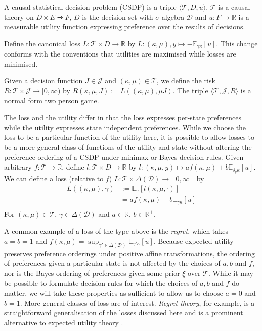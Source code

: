 \begin{definition}\label{def:CSDP}
A causal statistical decision problem (CSDP) is a triple $\langle \mathscr{T}, D, u \rangle$. $\mathscr{T}$ is a causal theory on $D\times E\rightarrowtriangle F$, $D$ is the decision set with $\sigma$-algebra $\mathcal{D}$ and $u:F\to \mathbb{R}$ is a measurable utility function expressing preference over the results of decisions.

Define the canonical loss $L:\mathscr{T}\times D\to \mathbb{R}$ by $L:(\kappa,\mu),y\mapsto -\mathbb{E}_{\gamma\kappa}[u]$. This change conforms with the conventions that utilities are maximised while losses are minimised.

Given a decision function $J\in\mathscr{J}$ and $(\kappa,\mu)\in \mathscr{T}$, we define the risk $R:\mathscr{T}\times \mathscr{J} \to [0,\infty)$ by $R(\kappa,\mu,J) := L((\kappa,\mu),\mu J)$. The triple $\langle \mathscr{T}, \mathscr{J}, R\rangle$ is a normal form two person game.
\end{definition}

The loss and the utility differ in that the loss expresses per-state preferences while the utility expresses state independent preferences. While we choose the loss to be a particular function of the utility here, it is possible to allow losses to be a more general class of functions of the utility and state without altering the preference ordering of a CSDP under minimax or Bayes decision rules. Given arbitrary $f:\mathscr{T}\to\mathbb{R}$, define $l:\mathscr{T}\times D\to \mathbb{R}$ by $l:(\kappa,\mu,y)\mapsto a f(\kappa,\mu) + b \mathbb{E}_{\delta_y\kappa}[u]$. We can define a loss (relative to $f$) $L:\mathscr{T}\times\Delta(\mathcal{D})\to [0,\infty]$ by
\begin{align}
    L((\kappa,\mu),\gamma) &:= \mathbb{E}_\gamma[l(\kappa,\mu,\cdot)]\\
    					   &= a f(\kappa,\mu) - b \mathbb{E}_{\gamma\kappa}[u]\label{eq:canonical_loss}\\
\end{align}
For $(\kappa,\mu)\in \mathscr{T}$, $\gamma\in \Delta(\mathcal{D})$ and $a\in \mathbb{R}$, $b\in \mathbb{R}^{+}$. 

A common example of a loss of the type above is the \emph{regret}, which takes $a=b=1$ and $f(\kappa,\mu) = \sup_{\gamma'\in \Delta(\mathcal{D})} \mathbb{E}_{\gamma'\kappa}[u]$. Because expected utility preserves preference orderings under positive affine transformations, the ordering of preferences given a particular state is not affected by the choices of $a,b$ and $f$, nor is the Bayes ordering of preferences given some prior $\xi$ over $\mathscr{T}$. While it may be possible to formulate decision rules for which the choices of $a,b$ and $f$ do matter, we will take these properties as sufficient to allow us to choose $a=0$ and $b=1$. More general classes of loss are of interest. \emph{Regret theory}, for example, is a straightforward generalisation of the losses discussed here and is a prominent alternative to expected utility theory \citep{loomes_regret_1982}.

